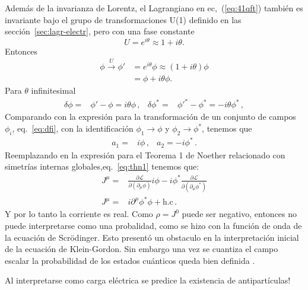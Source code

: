 \begin{frame}
Además de la invarianza de Lorentz, el Lagrangiano en ec,~(\ref{eq:41qft}) también es invariante bajo el grupo de transformaciones U(1) definido en las sección~\ref{sec:lagr-electr}, pero con una fase constante
\begin{equation*}
  U=e^{i\theta}\approx1+i\theta.
\end{equation*}
Entonces
\begin{align}
  \phi\overset{U}{\longrightarrow}\phi'&=e^{i\theta}\phi\approx(1+i\theta)\phi\nonumber\\
  &=\phi+i\theta\phi.
\end{align}
Para $\theta$ infinitesimal
\begin{align}
\label{eq:deltaphi}
  \delta\phi=&\phi'-\phi=i\theta\phi\,,&  \delta\phi^*=&{\phi'}^*-\phi^*=-i\theta\phi^*\,,
\end{align}
Comparando con la expresión para la transformación de un conjunto de campos $\phi_i$, eq.~\eqref{eq:dfi}, con la identificación $\phi_1\to \phi$ y $\phi_2\to \phi^{*}$, tenemos que
\begin{align}
  a_1=& i\phi\,, & a_2 =-i\phi^{*}\,.
\end{align}
Reemplazando en la expresión para el Teorema 1 de Noether relacionado con simetrías internas globales,eq.~\eqref{eq:thn1} tenemos que:
\begin{align}
  J^\mu=&\frac{\partial\mathcal{L}}{\partial(\partial_\mu\phi)}i\phi-i \phi^{*}\frac{\partial\mathcal{L}}{\partial(\partial_\mu\phi^*)}\nonumber\\
  \label{eq:45qft}
  J^\mu=&i\partial^\mu\phi^*\phi+\text{h.c}\,.
\end{align}
Y por lo tanto la corriente es real.
Como $\rho=J^{0}$ puede ser negativo, entonces no puede interpretarse como una
probalidad, como se hizo con la función de onda de la ecuación de
Scrödinger. Esto presentó un obstaculo en la interpretación inicial de
la ecuación de Klein-Gordon. Sin embargo una vez se cuantiza el
campo escalar la probabilidad de los estados cuánticos queda bien
definida \cite{Gross}.
\end{frame}

Al interpretarse como carga eléctrica se predice la existencia de antipartículas!

